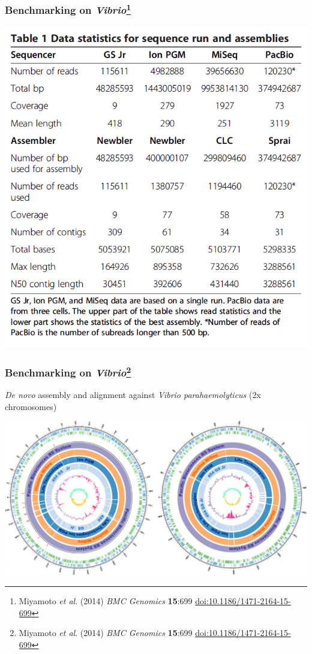 \begin{frame}
  \frametitle{Benchmarking on \textit{Vibrio}\footnote{\tiny{Miyamoto \textit{et al}. (2014) \textit{BMC Genomics} \textbf{15}:699 \href{http://dx.doi.org/10.1186/1471-2164-15-699}{doi:10.1186/1471-2164-15-699}}}}
    \begin{center}
      \includegraphics[height=0.8\textheight]{images/miyamoto_table}
    \end{center}      
\end{frame}

\begin{frame}
  \frametitle{Benchmarking on \textit{Vibrio}\footnote{\tiny{Miyamoto \textit{et al}. (2014) \textit{BMC Genomics} \textbf{15}:699 \href{http://dx.doi.org/10.1186/1471-2164-15-699}{doi:10.1186/1471-2164-15-699}}}}
    \textit{De novo} assembly and alignment against \textit{Vibrio parahaemolyticus} (2x chromosomes)
    \begin{center}
      \includegraphics[width=1\textwidth]{images/miyamoto_alignments}
    \end{center}      
\end{frame}

